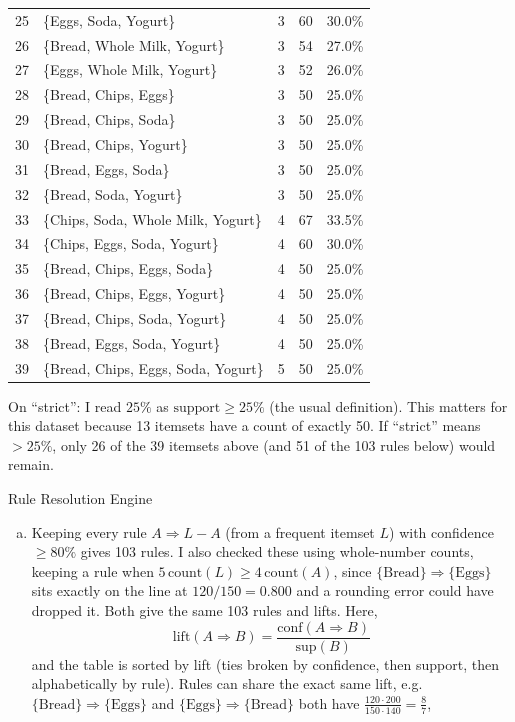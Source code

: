 \documentclass[12pt,letterpaper, onecolumn]{exam}
\begin{document}
\begin{questions}
\begin{solution}
{\begin{longtable}{|c|l|c|c|c|}
            25 & \{Eggs, Soda, Yogurt\} & 3 & 60 & 30.0\% \\
            26 & \{Bread, Whole Milk, Yogurt\} & 3 & 54 & 27.0\% \\
            27 & \{Eggs, Whole Milk, Yogurt\} & 3 & 52 & 26.0\% \\
            28 & \{Bread, Chips, Eggs\} & 3 & 50 & 25.0\% \\
            29 & \{Bread, Chips, Soda\} & 3 & 50 & 25.0\% \\
            30 & \{Bread, Chips, Yogurt\} & 3 & 50 & 25.0\% \\
            31 & \{Bread, Eggs, Soda\} & 3 & 50 & 25.0\% \\
            32 & \{Bread, Soda, Yogurt\} & 3 & 50 & 25.0\% \\
            33 & \{Chips, Soda, Whole Milk, Yogurt\} & 4 & 67 & 33.5\% \\
            34 & \{Chips, Eggs, Soda, Yogurt\} & 4 & 60 & 30.0\% \\
            35 & \{Bread, Chips, Eggs, Soda\} & 4 & 50 & 25.0\% \\
            36 & \{Bread, Chips, Eggs, Yogurt\} & 4 & 50 & 25.0\% \\
            37 & \{Bread, Chips, Soda, Yogurt\} & 4 & 50 & 25.0\% \\
            38 & \{Bread, Eggs, Soda, Yogurt\} & 4 & 50 & 25.0\% \\
            39 & \{Bread, Chips, Eggs, Soda, Yogurt\} & 5 & 50 & 25.0\% \\
        \end{longtable}
        }

        On ``strict'': I read $25\%$ as $\text{support}\geq25\%$ (the usual definition). This matters for this dataset because 13 itemsets have a count of exactly 50. If ``strict'' means $>25\%$, only 26 of the 39 itemsets above (and 51 of the 103 rules below) would remain.

        Rule Resolution Engine
        \begin{enumerate}[a.)]
            \item Keeping every rule $A\Rightarrow L-A$ (from a frequent itemset $L$) with confidence $\geq80\%$ gives 103 rules. I also checked these using whole-number counts, keeping a rule when $5\,\text{count}(L)\geq4\,\text{count}(A)$, since $\{\text{Bread}\}\Rightarrow\{\text{Eggs}\}$ sits exactly on the line at $120/150=0.800$ and a rounding error could have dropped it. Both give the same 103 rules and lifts. Here,
            \begin{equation*}
                \text{lift}(A\Rightarrow B) = \frac{\text{conf}(A\Rightarrow B)}{\text{sup}(B)}
            \end{equation*}
            and the table is sorted by lift (ties broken by confidence, then support, then alphabetically by rule). Rules can share the exact same lift, e.g. $\{\text{Bread}\}\Rightarrow\{\text{Eggs}\}$ and $\{\text{Eggs}\}\Rightarrow\{\text{Bread}\}$ both have $\tfrac{120\cdot200}{150\cdot140}=\tfrac{8}{7}$,
        \end{enumerate}


\end{solution}
\end{questions}
\end{document}
